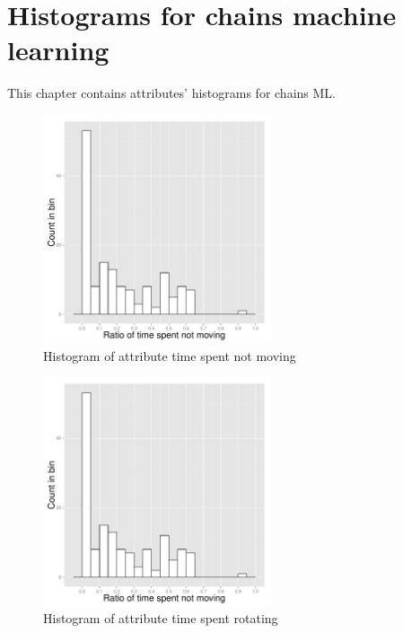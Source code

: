 \chapter{Histograms for chains machine learning}
This chapter contains attributes' histograms for chains ML.
\begin{figure}[!htbp]
  \centering
	\includegraphics[page=1,width=0.6\textwidth]{Images/chains_features_ML}
	\caption{Histogram of attribute time spent not moving}
	\label{fig:chains-distrib-stop}
\end{figure}

\begin{figure}[!htbp]
  \centering
	\includegraphics[page=2,width=0.6\textwidth]{Images/chains_features_ML}
	\caption{Histogram of attribute time spent rotating}
	\label{fig:chains-distrib-rotate}
\end{figure}

